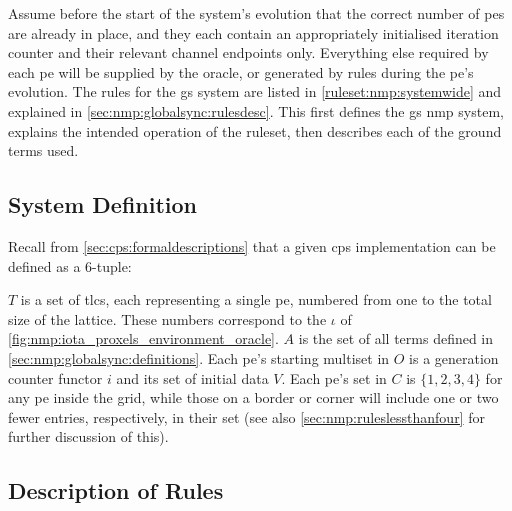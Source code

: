 Assume before the start of the system's evolution that the correct number of \glspl{pe} are already in place, and they each contain an appropriately initialised iteration counter and their relevant channel endpoints only.  Everything else required by each \gls{pe} will be supplied by the oracle, or generated by rules during the \gls{pe}'s evolution.  The rules for the \gls{gs} system are listed in \cref{ruleset:nmp:systemwide} and explained in \cref{sec:nmp:globalsync:rulesdesc}.  This  first defines the \gls{gs} \gls{nmp} system, explains the intended operation of the \gls{ruleset}, then describes each of the ground terms used.

\subsection{System Definition}
Recall from \cref{sec:cps:formaldescriptions} that a given \gls{cps} implementation can be defined as a 6-tuple:


\(T\) is a set of \glspl{tlc}, each representing a single \gls{pe}, numbered from one to the total size of the lattice.  These numbers correspond to the \(\iota\) of \cref{fig:nmp:iota_proxels_environment_oracle}.  \(A\) is the set of all terms defined in \cref{sec:nmp:globalsync:definitions}.  Each \gls{pe}'s starting multiset in \(O\) is a generation counter \gls{functor} \(i\) and its set of initial data \(V\).  Each \gls{pe}'s set in \(C\) is \(\{1, 2, 3, 4\}\) for any \gls{pe} inside the grid, while those on a border or corner will include one or two fewer entries, respectively, in their set (see also \cref{sec:nmp:ruleslessthanfour} for further discussion of this).

\subsection{\label{sec:nmp:globalsync:rulesdesc}Description of Rules}


